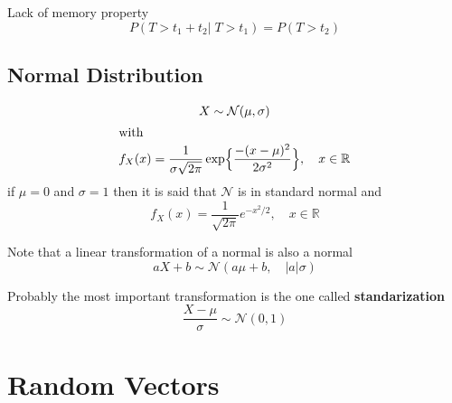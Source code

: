 \begin{tcolorbox}
    Lack of memory property
    \begin{equation*}
        P(T>t_1 + t_2 |\;T>t_1) = P(T>t_2)
    \end{equation*}
\end{tcolorbox}


\subsection{Normal Distribution} %
\label{sub:normal_distribution}


\begin{gather*}
    X \sim \mathcal{N}(\mu,\sigma)\\
    \intertext{with}
    f_X(x)=\dfrac{1}{\sigma\sqrt{2\pi}}\exp\Bigl\{\dfrac{-(x-\mu)^2}{2\sigma^2}
    \Bigr\}, \quad x\in\mathbb{R}
\end{gather*}
if $\mu=0$ and $\sigma=1$ then it is said that $\mathcal{N}$ is in standard
normal and
\begin{equation*}
    f_X(x)=\dfrac{1}{\sqrt{2\pi}}e^{-x^2/2}, \quad x\in\mathbb{R}
\end{equation*}

\begin{tcolorbox}
    Note that a linear transformation of a normal is also a normal
    \begin{equation*}
        aX+b \sim \mathcal{N}(a\mu+b, \quad|a|\sigma)
    \end{equation*}
\end{tcolorbox}

\begin{tcolorbox}
    Probably the most important transformation is the one called
    \textbf{standarization}
    \begin{equation*}
        \dfrac{X-\mu}{\sigma}\sim\mathcal{N}(0,1)
    \end{equation*}
\end{tcolorbox}


\section{Random Vectors} %
\label{sec:random_vectors}

